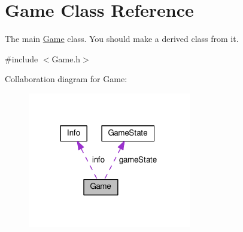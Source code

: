 \hypertarget{classGame}{}\section{Game Class Reference}
\label{classGame}


The main \hyperlink{classGame}{Game} class. You should make a derived class from it.  




{\ttfamily \#include $<$Game.\+h$>$}



Collaboration diagram for Game\+:\nopagebreak
\begin{figure}[H]
\begin{center}
\leavevmode
\includegraphics[width=202pt]{classGame__coll__graph}
\end{center}
\end{figure}
